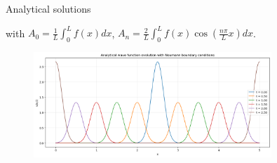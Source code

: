 \begin{frame}{Analytical solutions}
{\begin{itemize}
        with $A_0=\frac{1}{L}\int_0^Lf(x)dx$, $A_n=\frac{2}{L}\int_0^Lf(x)\cos\left(\frac{n\pi}{L}x\right)dx$.

        \vfill

        \begin{figure}[H]
            \centering
            \includegraphics[width=0.8\textwidth]{Immagini/plot-neumann-analytical.png}
        \end{figure}
    \end{itemize}}{}
\end{frame}

